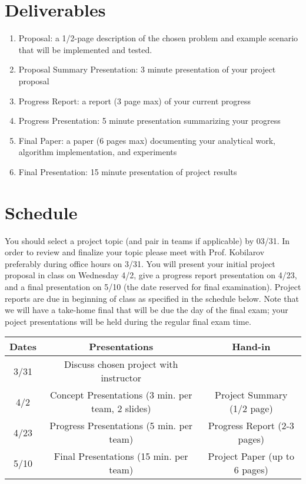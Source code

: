 \documentclass[11pt]{article}
\begin{document}
\section{Deliverables}
\begin{enumerate}
\item Proposal: a 1/2-page description of the chosen problem and example scenario
  that will be implemented and tested.
\item Proposal Summary Presentation: 3 minute presentation of your project proposal
\item Progress Report: a report (3 page max) of your current progress
\item Progress Presentation: 5 minute presentation summarizing your progress
\item Final Paper: a paper (6 pages max) documenting your analytical work,
  algorithm implementation, and experiments
\item Final Presentation: 15 minute presentation of project results
\end{enumerate}

\section{Schedule}
You should select a project topic (and pair in teams if applicable) by 03/31.
In order to review and finalize your topic please meet with Prof. Kobilarov preferably 
during office hours on 3/31. You will present your initial project proposal in class 
on Wednesday 4/2, give a progress report presentation on 4/23, and a final presentation on 
5/10 (the date reserved for final examination). 
Project reports are due in beginning of class as specified in the schedule below. 
Note that we will have a take-home final that will be due the day of the final exam; 
your poject presentations will be held during the regular final exam time.

\centering
\begin{tabular}{|c|c|c|}\hline
  Dates & Presentations & Hand-in \\\hline\hline
3/31 & Discuss chosen project with instructor & \\ \hline
4/2 & Concept Presentations (3 min. per team, 2 slides) & Project Summary (1/2 page) \\\hline
4/23 & Progress Presentations (5 min. per team) & Progress Report (2-3 pages) \\\hline
5/10 & Final Presentations (15 min. per team) & Project Paper (up to 6 pages)\\\hline
\end{tabular}


  
\end{document}
